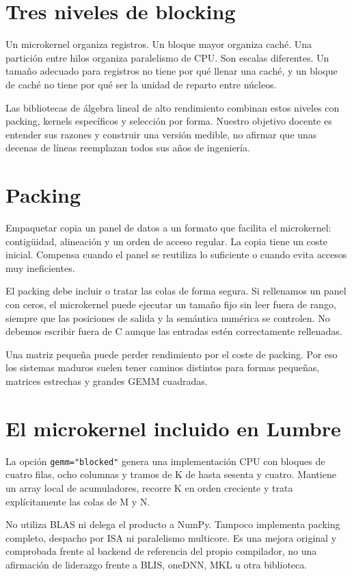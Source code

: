 \documentclass[12pt,a4paper,oneside]{report}
\begin{document}
\section{Tres niveles de blocking}
Un microkernel organiza registros. Un bloque mayor organiza caché. Una partición entre hilos organiza paralelismo de CPU. Son escalas diferentes. Un tamaño adecuado para registros no tiene por qué llenar una caché, y un bloque de caché no tiene por qué ser la unidad de reparto entre núcleos.

Las bibliotecas de álgebra lineal de alto rendimiento combinan estos niveles con packing, kernels específicos y selección por forma. Nuestro objetivo docente es entender sus razones y construir una versión medible, no afirmar que unas decenas de líneas reemplazan todos sus años de ingeniería.

\section{Packing}
Empaquetar copia un panel de datos a un formato que facilita el microkernel: contigüidad, alineación y un orden de acceso regular. La copia tiene un coste inicial. Compensa cuando el panel se reutiliza lo suficiente o cuando evita accesos muy ineficientes.

El packing debe incluir o tratar las colas de forma segura. Si rellenamos un panel con ceros, el microkernel puede ejecutar un tamaño fijo sin leer fuera de rango, siempre que las posiciones de salida y la semántica numérica se controlen. No debemos escribir fuera de C aunque las entradas estén correctamente rellenadas.

Una matriz pequeña puede perder rendimiento por el coste de packing. Por eso los sistemas maduros suelen tener caminos distintos para formas pequeñas, matrices estrechas y grandes GEMM cuadradas.

\section{El microkernel incluido en Lumbre}
La opción \texttt{gemm="blocked"} genera una implementación CPU con bloques de cuatro filas, ocho columnas y tramos de K de hasta sesenta y cuatro. Mantiene un array local de acumuladores, recorre K en orden creciente y trata explícitamente las colas de M y N.

No utiliza BLAS ni delega el producto a NumPy. Tampoco implementa packing completo, despacho por ISA ni paralelismo multicore. Es una mejora original y comprobada frente al backend de referencia del propio compilador, no una afirmación de liderazgo frente a BLIS, oneDNN, MKL u otra biblioteca.
\end{document}
